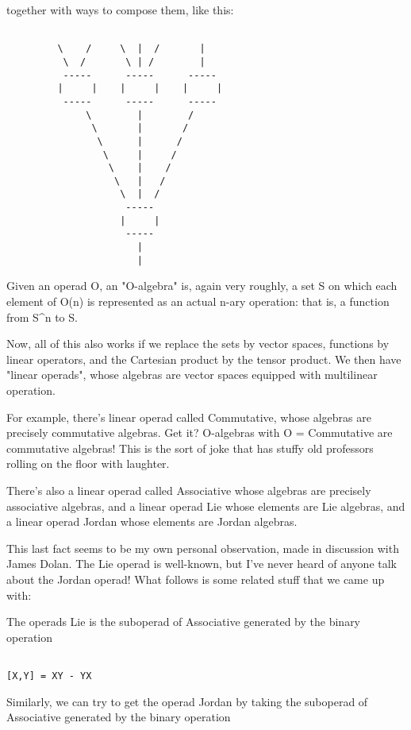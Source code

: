 together with ways to compose them, like this:



\begin{verbatim}

         \    /     \  |  /       | 
          \  /       \ | /        |
          -----      -----      -----
         |     |    |     |    |     |
          -----      -----      -----
              \        |        /  
               \       |       /
                \      |      /
                 \     |     /
                  \    |    / 
                   \   |   /  
                    \  |  /
                     -----
                    |     | 
                     -----
                       |
                       |
\end{verbatim}
    
Given an operad O, an "O-algebra" is, again very roughly, a set S on
which each element of O(n) is represented as an actual n-ary operation:
that is, a function from S^{n} to S.

Now, all of this also works if we replace the sets by vector spaces,
functions by linear operators, and the Cartesian product by the tensor
product.  We then have "linear operads", whose algebras are vector
spaces equipped with multilinear operation.

For example, there's linear operad called Commutative, whose algebras
are precisely commutative algebras.  Get it?  O-algebras with O = 
Commutative are commutative algebras!  This is the sort of joke that 
has stuffy old professors rolling on the floor with laughter.

There's also a linear operad called Associative whose algebras are 
precisely associative algebras, and a linear operad Lie whose elements 
are Lie algebras, and a linear operad Jordan whose elements are Jordan 
algebras.  

This last fact seems to be my own personal observation, made in
discussion with James Dolan.  The Lie operad is well-known, but I've
never heard of anyone talk about the Jordan operad!  What follows is
some related stuff that we came up with:

The operads Lie is the suboperad of Associative generated by the
binary operation


\begin{verbatim}

[X,Y] = XY - YX 
\end{verbatim}
    
Similarly, we can try to get the operad Jordan by taking the suboperad 
of Associative generated by the binary operation


